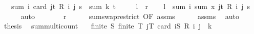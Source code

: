 \begin{isabellebody}
\ \ \ {\isachardoublequoteopen}sum\ {\isacharparenleft}{\kern0pt}{\isasymlambda}i{\isachardot}{\kern0pt}\ {\isacharparenleft}{\kern0pt}card\ {\isacharbraceleft}{\kern0pt}j{\isasymin}t{\isachardot}{\kern0pt}\ R\ i\ j{\isacharbraceright}{\kern0pt}{\isacharparenright}{\kern0pt}{\isacharparenright}{\kern0pt}\ s\ {\isacharequal}{\kern0pt}\ sum\ k\ t{\isachardoublequoteclose}\isanewline
\ \ \ \ {\isacharparenleft}{\kern0pt}\ {\isachardoublequoteopen}{\isacharquery}{\kern0pt}l\ {\isacharequal}{\kern0pt}\ {\isacharquery}{\kern0pt}r{\isachardoublequoteclose}{\isacharparenright}{\kern0pt}\isanewline
%
\isadelimproof
%
\endisadelimproof
%
\isatagproof
{}\isamarkupfalse%
{\isacharminus}{\kern0pt}\isanewline
\ \ \isamarkupfalse%
\ {\isachardoublequoteopen}{\isacharquery}{\kern0pt}l\ {\isacharequal}{\kern0pt}\ sum\ {\isacharparenleft}{\kern0pt}{\isasymlambda}i{\isachardot}{\kern0pt}\ sum\ {\isacharparenleft}{\kern0pt}{\isasymlambda}x{\isachardot}{\kern0pt}{}{\isacharparenright}{\kern0pt}\ {\isacharbraceleft}{\kern0pt}j{\isasymin}t{\isachardot}{\kern0pt}\ R\ i\ j{\isacharbraceright}{\kern0pt}{\isacharparenright}{\kern0pt}\ s{\isachardoublequoteclose}\isanewline
\ \ \ \ \isamarkupfalse%
\ auto\isanewline
\ \ \isamarkupfalse%
\ \isamarkupfalse%
\ {\isachardoublequoteopen}{\isasymdots}\ {\isacharequal}{\kern0pt}\ {\isacharquery}{\kern0pt}r{\isachardoublequoteclose}\isanewline
\ \ \ \ \isamarkupfalse%
\ sum{\isachardot}{\kern0pt}swap{\isacharunderscore}{\kern0pt}restrict\ {\isacharbrackleft}{\kern0pt}OF\ assms{\isacharparenleft}{\kern0pt}{}{\isacharminus}{\kern0pt}{}{\isacharparenright}{\kern0pt}{\isacharbrackright}{\kern0pt}\isanewline
\ \ \ \ \isamarkupfalse%
\ assms{\isacharparenleft}{\kern0pt}{}{\isacharparenright}{\kern0pt}\ \isamarkupfalse%
\ auto\isanewline
\ \ \isamarkupfalse%
\ \isamarkupfalse%
\ {\isacharquery}{\kern0pt}thesis\ \isacommand{{\isachardot}{\kern0pt}}\isamarkupfalse%
\isanewline
{}\isamarkupfalse%
%
\endisatagproof
{\isafoldproof}%
%
\isadelimproof
\isanewline
%
\endisadelimproof
\isanewline
{}\isamarkupfalse%
\ sum{\isacharunderscore}{\kern0pt}multicount{\isacharcolon}{\kern0pt}\isanewline
\ \ \ {\isachardoublequoteopen}finite\ S{\isachardoublequoteclose}\ {\isachardoublequoteopen}finite\ T{\isachardoublequoteclose}\ {\isachardoublequoteopen}{\isasymforall}j{\isasymin}T{\isachardot}{\kern0pt}\ {\isacharparenleft}{\kern0pt}card\ {\isacharbraceleft}{\kern0pt}i{\isasymin}S{\isachardot}{\kern0pt}\ R\ i\ j{\isacharbraceright}{\kern0pt}\ {\isacharequal}{\kern0pt}\ k{\isacharparenright}{\kern0pt}{\isachardoublequoteclose}\isanewline

\end{isabellebody}
